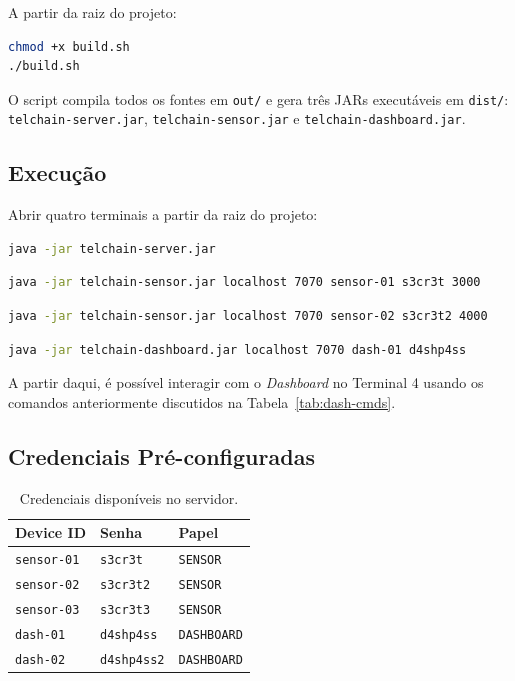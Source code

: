 \documentclass[12pt, a4paper]{article}
\begin{document}
A partir da raiz do projeto:
\begin{lstlisting}[language=bash, caption={Compilação e geração dos JARs.}]
chmod +x build.sh
./build.sh
\end{lstlisting}

O script compila todos os fontes em \texttt{out/} e gera três JARs executáveis em \texttt{dist/}:
\texttt{telchain-server.jar}, \texttt{telchain-sensor.jar} e \texttt{telchain-dashboard.jar}.

\subsection{Execução}

Abrir quatro terminais a partir da raiz do projeto:

\begin{lstlisting}[language=bash, caption={Terminal 1 --- Servidor.}]
java -jar telchain-server.jar
\end{lstlisting}

\begin{lstlisting}[language=bash, caption={Terminal 2 --- Sensor 01 (intervalo de 3 s).}]
java -jar telchain-sensor.jar localhost 7070 sensor-01 s3cr3t 3000
\end{lstlisting}

\begin{lstlisting}[language=bash, caption={Terminal 3 --- Sensor 02 (intervalo de 4 s).}]
java -jar telchain-sensor.jar localhost 7070 sensor-02 s3cr3t2 4000
\end{lstlisting}

\begin{lstlisting}[language=bash, caption={Terminal 4 --- Dashboard.}]
java -jar telchain-dashboard.jar localhost 7070 dash-01 d4shp4ss
\end{lstlisting}

A partir daqui, é possível interagir com o \emph{Dashboard} no Terminal 4 usando os comandos anteriormente discutidos na Tabela~\ref{tab:dash-cmds}.

\subsection{Credenciais Pré-configuradas}

\begin{table}[H]
\centering
\caption{Credenciais disponíveis no servidor.}
\label{tab:creds}
\begin{tabular}{lll}
\toprule
\textbf{Device ID} & \textbf{Senha} & \textbf{Papel} \\
\midrule
\texttt{sensor-01} & \texttt{s3cr3t}    & \texttt{SENSOR} \\
\texttt{sensor-02} & \texttt{s3cr3t2}   & \texttt{SENSOR} \\
\texttt{sensor-03} & \texttt{s3cr3t3}   & \texttt{SENSOR} \\
\texttt{dash-01}   & \texttt{d4shp4ss}  & \texttt{DASHBOARD} \\
\texttt{dash-02}   & \texttt{d4shp4ss2} & \texttt{DASHBOARD} \\
\bottomrule
\end{tabular}
\end{table}
\end{document}
